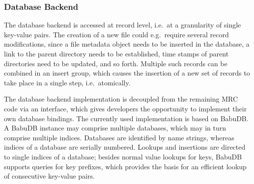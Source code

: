 \subsubsection{Database Backend}

\newenvironment{mappingTable}[1]{\fontfamily{pcr}\begin{center}\begin{footnotesize}\begin{tabular}{|l|} \hline \textnormal{\textbf{\small{#1}}} \\ \hline \hline \\}{\end{tabular}\end{footnotesize}\end{center}\fontfamily{default}}

\newenvironment{internalMappingTable}[1]{\tabularx{13.3cm}{|m{2.5cm}|m{1.5cm}|X|} \multicolumn{3}{l}{\textnormal{\textbf{\small{#1}}}} \\ \multicolumn{3}{l}{} \vspace{-0.3cm} \\ \hline \textnormal{\textbf{Element}} & \textnormal{\textbf{\# Bytes}} & \textnormal{\textbf{Description}} \\ \hline }{\endtabularx}

The database backend is accessed at record level, i.e.\ at a granularity of single key-value pairs. The creation of a new file could e.g.\ require several record modifications, since a file metadata object needs to be inserted in the database, a link to the parent directory needs to be established, time stamps of parent directories need to be updated, and so forth. Multiple such records can be combined in an insert group, which causes the insertion of a new set of records to take place in a single step, i.e.\ atomically. 

The database backend implementation is decoupled from the remaining MRC code via an interface, which gives developers the opportunity to implement their own database bindings. The currently used implementation is based on BabuDB. A BabuDB instance may comprise multiple databases, which may in turn comprise multiple indices. Databases are identified by name strings, whereas indices of a database are serially numbered. Lookups and insertions are directed to single indices of a database; besides normal value lookups for keys, BabuDB supports queries for key prefixes, which provides the basis for an efficient lookup of consecutive key-value pairs.

